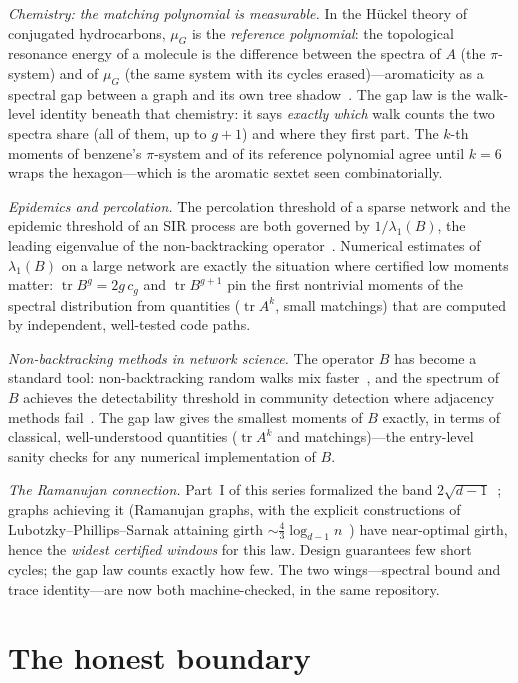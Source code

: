 \documentclass[11pt]{article}
\DeclareMathOperator{\tr}{tr}
\begin{document}
\emph{Chemistry: the matching polynomial is measurable.} In the H\"uckel theory of
conjugated hydrocarbons, $\mu_G$ is the \emph{reference polynomial}: the topological
resonance energy of a molecule is the difference between the spectra of $A$ (the
$\pi$-system) and of $\mu_G$ (the same system with its cycles erased)---aromaticity as a
spectral gap between a graph and its own tree shadow~\cite{Aihara1976,Gutman1979}. The gap
law is the walk-level identity beneath that chemistry: it says \emph{exactly which} walk
counts the two spectra share (all of them, up to $g+1$) and where they first part. The
$k$-th moments of benzene's $\pi$-system and of its reference polynomial agree until $k = 6$
wraps the hexagon---which is the aromatic sextet seen combinatorially.

\emph{Epidemics and percolation.} The percolation threshold of a sparse network and the
epidemic threshold of an SIR process are both governed by $1/\lambda_1(B)$, the leading
eigenvalue of the non-backtracking operator~\cite{KarrerNewman2014}. Numerical estimates of
$\lambda_1(B)$ on a large network are exactly the situation where certified low moments
matter: $\tr B^g = 2g\,c_g$ and $\tr B^{g+1}$ pin the first nontrivial moments of the
spectral distribution from quantities ($\tr A^k$, small matchings) that are computed by
independent, well-tested code paths.

\emph{Non-backtracking methods in network science.} The operator $B$ has become a standard
tool: non-backtracking random walks mix faster~\cite{ABLS2007}, and the spectrum of $B$
achieves the detectability threshold in community detection where adjacency methods
fail~\cite{Krzakala2013}. The gap law gives the smallest moments of $B$ exactly, in terms of
classical, well-understood quantities ($\tr A^k$ and matchings)---the entry-level sanity
checks for any numerical implementation of $B$.

\emph{The Ramanujan connection.} Part~I of this series formalized the band
$2\sqrt{d-1}$~\cite{MarinGG2026}; graphs achieving it (Ramanujan graphs, with the explicit
constructions of Lubotzky--Phillips--Sarnak attaining girth
$\sim \tfrac43 \log_{d-1} n$~\cite{LPS1988}) have near-optimal girth, hence the
\emph{widest certified windows} for this law. Design guarantees few short
cycles; the gap law counts exactly how few. The two wings---spectral bound and trace
identity---are now both machine-checked, in the same repository.

\section{The honest boundary}
\label{sec:boundary}
\end{document}
